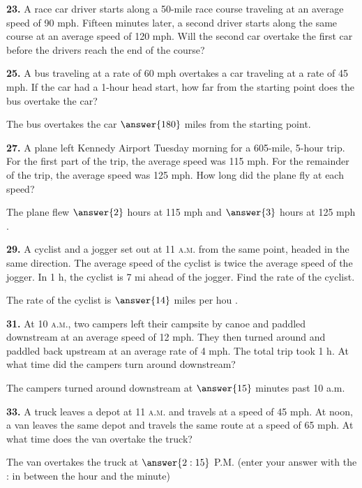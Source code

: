 \documentclass{ximera}
\begin{document}
\begin{problem}
\textbf{23.} A race car driver starts along a 50-mile race course traveling at an average speed
  of 90 mph. Fifteen minutes later, a second driver starts along the same course at an
  average speed of 120 mph. Will the second car overtake the first car before the drivers
  reach the end of the course?

\begin{multipleChoice}
\end{multipleChoice}
\end{problem}

\begin{problem}
\textbf{25.} A bus traveling at a rate of 60 mph overtakes a car traveling at a rate of 45 mph.
  If the car had a 1-hour head start, how far from the starting point does the bus
  overtake the car?

The bus overtakes the car $\answer{180}$ miles from the starting point.
\end{problem}

\begin{problem}
\textbf{27.} A plane left Kennedy Airport Tuesday morning for a 605-mile, 5-hour trip. For the
  first part of the trip, the average speed was 115 mph. For the remainder of the trip,
  the average speed was 125 mph. How long did the plane fly at each speed?

The plane flew $\answer{2}$ hours at 115 mph and $\answer{3}$ hours at 125 mph .
\end{problem}

\begin{problem}
\textbf{29.} A cyclist and a jogger set out at 11 \textsc{a.m.} from the same point, headed in
  the same direction. The average speed of the cyclist is twice the average speed of the
  jogger. In 1 h, the cyclist is 7 mi ahead of the jogger. Find the rate of the cyclist.

The rate of the cyclist is $\answer{14}$ miles per hou .
\end{problem}

\begin{problem}
\textbf{31.} At 10 \textsc{a.m.}, two campers left their campsite by canoe and paddled
  downstream at an average speed of 12 mph. They then turned around and paddled back
  upstream at an average rate of 4 mph. The total trip took 1 h. At what time did the
  campers turn around downstream?

The campers turned around downstream at $ \answer{15}$ minutes past 10 a.m.
\end{problem}

\begin{problem}
\textbf{33.} A truck leaves a depot at 11 \textsc{a.m.} and travels at a speed of 45 mph. At
  noon, a van leaves the same depot and travels the same route at a speed of 65 mph. At
  what time does the van overtake the truck?

The van overtakes the truck at \( \answer{2:15} \) P.M. (enter your answer with the : in between the hour and the minute)
\end{problem}
\end{document}
